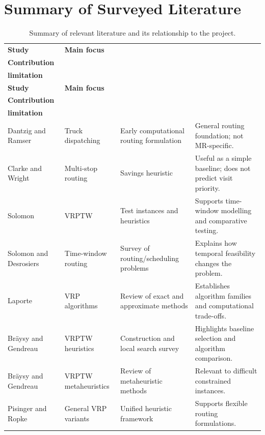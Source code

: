 \documentclass[12pt,a4paper,oneside]{report}
\begin{document}
\section{Summary of Surveyed Literature}
\begin{longtable}{>{\RaggedRight\arraybackslash}p{30mm}>{\RaggedRight\arraybackslash}p{33mm}>{\RaggedRight\arraybackslash}p{35mm}>{\RaggedRight\arraybackslash}p{34mm}}
\caption{Summary of relevant literature and its relationship to the project.}\label{tab:lit-survey}\\
\toprule
\textbf{Study} & \textbf{Main focus} & \shortstack[l]{\textbf{Method /}\\\textbf{Contribution}} & \shortstack[l]{\textbf{Relevance or}\\\textbf{limitation}}\\
\midrule
\endfirsthead
\toprule
\textbf{Study} & \textbf{Main focus} & \shortstack[l]{\textbf{Method /}\\\textbf{Contribution}} & \shortstack[l]{\textbf{Relevance or}\\\textbf{limitation}}\\
\midrule
\endhead
Dantzig and Ramser \cite{dantzig1959} & Truck dispatching & Early computational routing formulation & General routing foundation; not MR-specific.\\
Clarke and Wright \cite{clarke1964} & Multi-stop routing & Savings heuristic & Useful as a simple baseline; does not predict visit priority.\\
Solomon \cite{solomon1987} & VRPTW & Test instances and heuristics & Supports time-window modelling and comparative testing.\\
Solomon and Desrosiers \cite{solomonDesrosiers1988} & Time-window routing & Survey of routing/scheduling problems & Explains how temporal feasibility changes the problem.\\
Laporte \cite{laporte1992} & VRP algorithms & Review of exact and approximate methods & Establishes algorithm families and computational trade-offs.\\
Br\"aysy and Gendreau \cite{braysy2005a} & VRPTW heuristics & Construction and local search survey & Highlights baseline selection and algorithm comparison.\\
Br\"aysy and Gendreau \cite{braysy2005b} & VRPTW metaheuristics & Review of metaheuristic methods & Relevant to difficult constrained instances.\\
Pisinger and Ropke \cite{pisinger2007} & General VRP variants & Unified heuristic framework & Supports flexible routing formulations.\\

\end{longtable}
\end{document}
